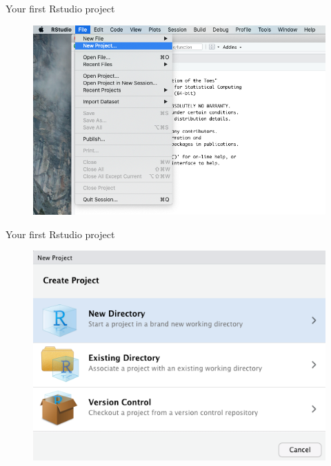 \documentclass[ignorenonframetext,]{beamer}
\begin{document}
\begin{frame}{Your first Rstudio project}
\protect\hypertarget{your-first-rstudio-project}{}

\begin{figure}
\includegraphics[scale=0.35]{figures/new-project-1.png}
\end{figure}

\end{frame}

\begin{frame}{Your first Rstudio project}
\protect\hypertarget{your-first-rstudio-project-1}{}

\begin{figure}
\includegraphics[scale=0.43]{figures/new-project-2.png}
\end{figure}

\end{frame}
\end{document}
